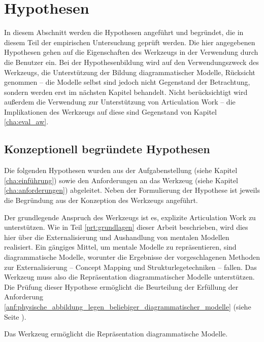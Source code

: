 \section{Hypothesen} %
\label{sec:hypothesen}

In diesem Abschnitt werden die Hypothesen angeführt und begründet, die in diesem Teil der empirischen Untersuchung geprüft werden. Die hier angegebenen Hypothesen gehen auf die Eigenschaften des Werkzeugs in der Verwendung durch die Benutzer ein. Bei der Hypothesenbildung wird auf den Verwendungszweck des Werkzeugs, die Unterstützung der Bildung diagrammatischer Modelle, Rücksicht genommen -- die Modelle selbst sind jedoch nicht Gegenstand der Betrachtung, sondern werden erst im nächsten Kapitel behandelt. Nicht berücksichtigt wird außerdem die Verwendung zur Unterstützung von Articulation Work -- die Implikationen des Werkzeugs auf diese sind Gegenstand von Kapitel \ref{cha:eval_aw}.

\subsection{Konzeptionell begründete Hypothesen} %
\label{sub:konzeptionell_begründete_hypothesen}

Die folgenden Hypothesen wurden aus der Aufgabenstellung (siehe Kapitel \ref{cha:einführung}) sowie den Anforderungen an das Werkzeug (siehe Kapitel \ref{cha:anforderungen}) abgeleitet. Neben der Formulierung der Hypothese ist jeweils die Begründung aus der Konzeption des Werkzeugs angeführt.

Der grundlegende Anspruch des Werkzeugs ist es, explizite Articulation Work zu unterstützen. Wie in Teil \ref{prt:grundlagen} dieser Arbeit beschrieben, wird dies hier über die Externalisierung und Aushandlung von mentalen Modellen realisiert. Ein gängiges Mittel, um mentale Modelle zu repräsentieren, sind diagrammatische Modelle, worunter die Ergebnisse der vorgeschlagenen Methoden zur Externalisierung -- Concept Mapping und Strukturlegetechniken -- fallen. Das Werkzeug muss also die Repräsentation diagrammatischer Modelle unterstützen. Die Prüfung dieser Hypothese ermöglicht die Beurteilung der Erfüllung der Anforderung \ref{anf:physische_abbildung_legen_beliebiger_diagrammatischer_modelle} (siehe Seite \pageref{anf:physische_abbildung_legen_beliebiger_diagrammatischer_modelle}). 

\begin{hyp}
	\label{hyp:diagmodelle}
	Das Werkzeug ermöglicht die Repräsentation diagrammatische Modelle.
\end{hyp}

